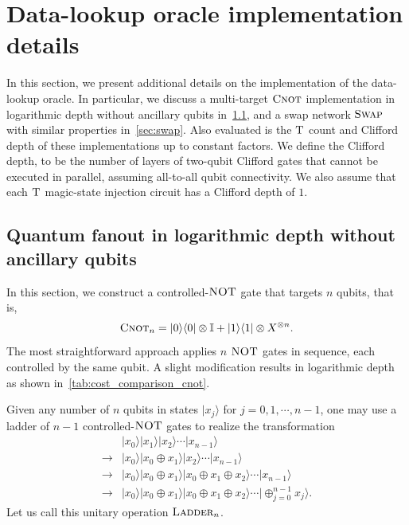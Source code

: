 \documentclass[a4paper,onecolumn,10pt,accepted=2024-05-22]{quantumarticle}
\newcommand{\ket}[1]{| #1\rangle}        %
\newcommand{\bra}[1]{\langle #1|}        %
\begin{document}
	
	\section{Data-lookup oracle implementation details}
	\label{sec:data-lookup-details}
	In this section, we present additional details on the implementation of the data-lookup oracle. In particular, we discuss a multi-target $\textsc{Cnot}$ implementation in logarithmic depth without ancillary qubits in~\cref{sec:cnot_log_depth}, and a swap network $\textsc{Swap}$ with similar properties in~\cref{sec:swap}. Also evaluated is the $\textsc{T}$ count and Clifford depth of these implementations up to constant factors. We define the Clifford depth, to be the number of layers of two-qubit Clifford gates that cannot be executed in parallel, assuming all-to-all qubit connectivity. We also assume that each $\textsc{T}$ magic-state injection circuit has a Clifford depth of $1$.
	
	\subsection{Quantum fanout in logarithmic depth without ancillary qubits}
	\label{sec:cnot_log_depth}
	In this section, we construct a controlled-$\textsc{NOT}$ gate that targets $n$ qubits, that is,
	\begin{align}
	\label{eq:CNOT_n}
	\textsc{Cnot}_n=\ket{0}\bra{0}\otimes \mathbb{I}+\ket{1}\bra{1}\otimes X^{\otimes n}.
	\end{align}
	The most straightforward approach applies $n$ $\textsc{NOT}$ gates in sequence, each controlled by the same qubit. A slight modification results in logarithmic depth as shown in~\cref{tab:cost_comparison_cnot}.
	
	Given any number of $n$ qubits in states $\ket{x_{j}}$ for $j=0,1,\cdots,n-1$, one may use a ladder of $n-1$ controlled-$\textsc{NOT}$ gates to realize the transformation
	\begin{align}\nonumber
	&\ket{x_0}\ket{x_1}\ket{x_2}\cdots\ket{x_{n-1}}\\\nonumber
	\rightarrow&\ket{x_0}\ket{x_0\oplus x_1}\ket{x_2}\cdots\ket{x_{n-1}}\\\nonumber
	\rightarrow&\ket{x_0}\ket{x_0\oplus x_1}\ket{x_0\oplus x_1\oplus x_2}\cdots\ket{x_{n-1}}\\
	\rightarrow&\ket{x_0}\ket{x_0\oplus x_1}\ket{x_0\oplus x_1\oplus x_2}\cdots\ket{\oplus_{j=0}^{{n-1}}x_j}.
	\end{align}
	Let us call this unitary operation $\textsc{Ladder}_n$. 
	
\end{document}
